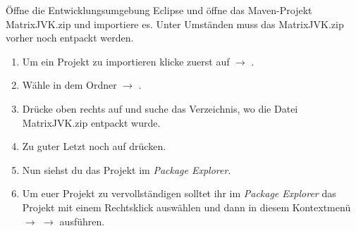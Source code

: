 \newcommand{\jvkpackage}{MatrixJVK.zip }


 Öffne die Entwicklungsumgebung Eclipse und öffne das Maven-Projekt \jvkpackage und importiere es.
 Unter Umständen muss das \jvkpackage vorher noch entpackt werden.
 \begin{enumerate}
     \item Um ein Projekt zu importieren klicke zuerst auf  $\rightarrow$      .
     \item Wähle in dem Ordner  $\to$ .
     \item Drücke oben rechts auf  und suche das Verzeichnis, wo die Datei \jvkpackage entpackt wurde.
     \item Zu guter Letzt noch auf  drücken.
     \item Nun siehst du das Projekt im \textit{Package Explorer}.
     \item Um euer Projekt zu vervollständigen solltet ihr im \textit{Package Explorer} das Projekt mit einem Rechtsklick auswählen und dann in diesem Kontextmenü  $\rightarrow$  $\rightarrow$  ausführen.
 \end{enumerate}

